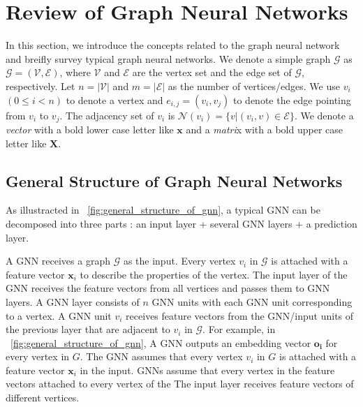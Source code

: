 \section{Review of Graph Neural Networks}

In this section, we introduce the concepts related to the graph neural network and breifly survey typical graph neural networks.
We denote a simple graph $\mathcal{G}$ as $\mathcal{G}=(\mathcal{V}, \mathcal{E})$, where $\mathcal{V}$ and $\mathcal{E}$ are the vertex set and the edge set of $\mathcal{G}$, respectively.
Let $n=|\mathcal{V}|$ and $m=|\mathcal{E}|$ as the number of vertices/edges. 
We use $v_i$ $(0 \leq i < n)$ to denote a vertex and $e_{i,j}=(v_i, v_j)$ to denote the edge pointing from $v_i$ to $v_j$.
The adjacency set of $v_i$ is $\mathcal{N}(v_i)=\{v|(v_i, v) \in \mathcal{E}\}$.
We denote a \emph{vector} with a bold lower case letter like $\boldsymbol{x}$ and a \emph{matri}x with a bold upper case letter like $\boldsymbol{X}$.

\subsection{General Structure of Graph Neural Networks}

As illustracted in \figurename~\ref{fig:general_structure_of_gnn}, a typical GNN can be decomposed into three parts \cite{comprehensive-survey-wu-2020}: an input layer + several GNN layers + a prediction layer.

A GNN receives a graph $\mathcal{G}$ as the input.
Every vertex $v_i$ in $\mathcal{G}$ is attached with a feature vector $\boldsymbol{x}_i$ to describe the properties of the vertex.
The input layer of the GNN receives the feature vectors from all vertices and passes them to GNN layers.
A GNN layer consists of $n$ GNN units with each GNN unit corresponding to a vertex.
A GNN unit $v_i$ receives feature vectors from the GNN/input units of the previous layer that are adjacent to $v_i$ in $\mathcal{G}$.
For example, in \figurename~\ref{fig:general_structure_of_gnn}, 
A GNN outputs an embedding vector $\boldsymbol{o_i}$ for every vertex in $G$.
The GNN assumes that every vertex $v_i$ in $G$ is attached with a feature vector $\boldsymbol{x}_i$ in the input.
GNNs assume that every vertex in the feature vectors attached to every vertex of the 
The input layer receives feature vectors of different vertices.

